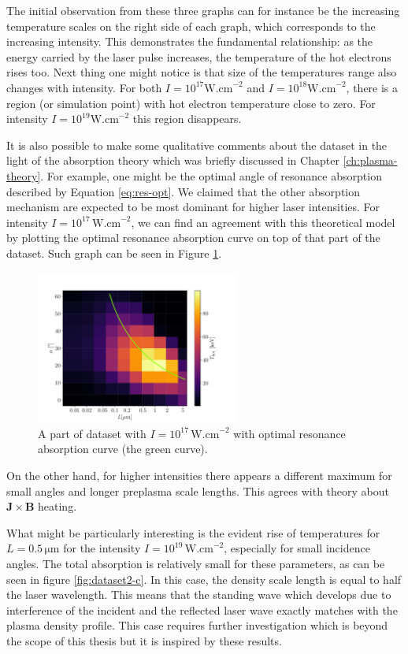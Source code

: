 The initial observation from these three graphs can for instance be the increasing temperature scales on the right side of each graph, which corresponds to the increasing intensity. This demonstrates the fundamental relationship: as the energy carried by the laser pulse increases, the temperature of the hot electrons rises too. Next thing one might notice is that size of the temperatures range also changes with intensity. For both $I = 10^{17} \mathrm{W.cm}^{-2}$ and $I = 10^{18} \mathrm{W.cm}^{-2}$, there is a region (or simulation point) with hot electron temperature close to zero. For intensity $I = 10^{19} \mathrm{W.cm}^{-2}$ this region disappears. 

It is also possible to make some qualitative comments about the dataset in the light of the absorption theory which was briefly discussed in Chapter \ref{ch:plasma-theory}. For example, one might be the optimal angle of resonance absorption described by Equation \ref{eq:res-opt}. We claimed that the other absorption mechanism are expected to be most dominant for higher laser intensities. For intensity $I = 10^{17} \, \mathrm{W.cm}^{-2}$, we can find an agreement with this theoretical model by plotting the optimal resonance absorption curve on top of that part of the dataset. Such graph can be seen in Figure \ref{fig:opt-res-abs}.

\begin{figure}[t]
	\centering
	\includegraphics[width=0.60\textwidth]{figures/optimal-res-absorption}
	\caption{A part of dataset with $I = 10^{17} \, \mathrm{W.cm}^{-2}$ with optimal resonance absorption curve (the green curve).}
	\label{fig:opt-res-abs}
\end{figure}

On the other hand, for higher intensities there appears a different maximum for small angles and longer preplasma scale lengths. This agrees with theory about $\bm{J} \times \bm{B}$ heating.

What might be particularly interesting is the evident rise of temperatures for $L=0.5 \,\mathrm{\mu m}$ for the intensity $I = 10^{19}\, \mathrm{W.cm}^{-2}$, especially for small incidence angles. The total absorption is relatively small for these parameters, as can be seen in figure \ref{fig:dataset2-c}. In this case, the density scale length is equal to half the laser wavelength. This means that the standing wave which develops due to interference of the incident and the reflected laser wave exactly matches with the plasma density profile. This case requires further investigation which is beyond the scope of this thesis but it is inspired by these results.


